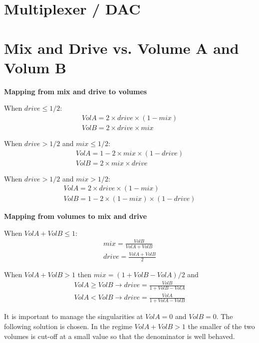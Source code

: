 \documentclass[draft,landscape, 11pt, oneside]{report}
\begin{document}
\section{Multiplexer / DAC}\label{potmux}

\section{Mix and Drive vs. Volume A and Volum B}

\textbf{Mapping from mix and drive to volumes} 

When $drive\leq 1/2$:
\begin{eqnarray}
VolA=2\times drive \times (1-mix) \\
VolB=2\times drive \times mix 
\end{eqnarray}

When $drive> 1/2$ and $mix \leq 1/2$:
\begin{eqnarray}
VolA=1-2\times mix \times (1-drive) \\
VolB=2\times mix \times drive 
\end{eqnarray}

When $drive> 1/2$ and $mix > 1/2$:
\begin{eqnarray}
VolA=2\times drive \times (1-mix) \\
VolB=1-2\times (1-mix) \times (1-drive) 
\end{eqnarray}

\textbf{Mapping from volumes to mix and drive} 

When $VolA+VolB\leq 1$:
\begin{eqnarray}
  mix=\frac{VolB}{VolA+VolB} \\
  drive=\frac{VolA+VolB}{2} 
\end{eqnarray}

When $VolA+VolB>1$ then $mix = (1+VolB-VolA)/2$ and
\begin{eqnarray}
  VolA \geq VolB \to drive=\frac{VolB}{1+VolB-VolA} \\
  VolA < VolB \to drive=\frac{VolA}{1+VolA-VolB}
\end{eqnarray}

It is important to manage the singularities at $VolA=0$ and $VolB=0$. The following solution is chosen. In the regime $VolA+VolB>1$ the smaller of the two volumes is cut-off at a small value so that the denominator is well behaved.
\end{document}
